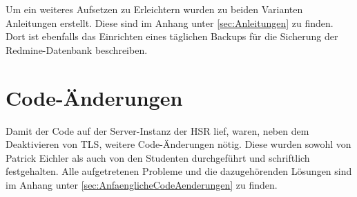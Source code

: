 Um ein weiteres Aufsetzen zu Erleichtern wurden zu beiden Varianten Anleitungen erstellt. Diese sind im Anhang unter \ref{sec:Anleitungen} zu finden.
Dort ist ebenfalls das Einrichten eines täglichen Backups für die Sicherung der Redmine-Datenbank beschreiben.


\section{Code-Änderungen}
Damit der Code auf der Server-Instanz der HSR lief, waren, neben dem Deaktivieren von \gls{TLS}, weitere Code-Änderungen nötig. Diese wurden sowohl von Patrick Eichler als auch von den Studenten durchgeführt und schriftlich festgehalten. Alle aufgetretenen Probleme und die dazugehörenden Lösungen sind im Anhang unter \ref{sec:AnfaenglicheCodeAenderungen} zu finden.
